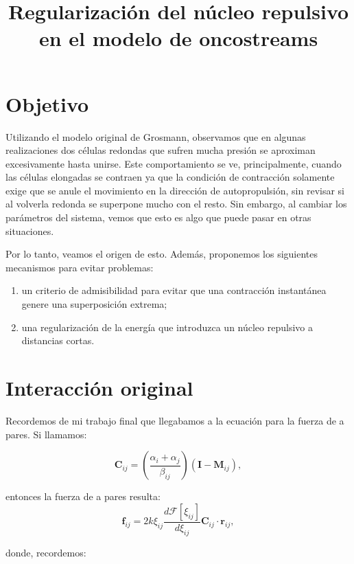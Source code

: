 \documentclass[11pt,a4paper]{article}
\title{Regularización del núcleo repulsivo en el modelo de oncostreams}
\author{}
\date{}
\begin{document}
\maketitle

\section{Objetivo}

Utilizando el modelo original de Grosmann, observamos que en algunas realizaciones dos células redondas que sufren mucha presión se aproximan excesivamente hasta unirse. Este comportamiento se ve, principalmente, cuando las células elongadas se contraen ya que la condición de contracción solamente exige que se anule el movimiento en la dirección de autopropulsión, sin revisar si al volverla redonda se superpone mucho con el resto. Sin embargo, al cambiar los parámetros del sistema, vemos que esto es algo que puede pasar en otras situaciones.


Por lo tanto, veamos el origen de esto. Además, proponemos los siguientes mecanismos para evitar problemas:

\begin{enumerate}
    \item un criterio de admisibilidad para evitar que una contracción instantánea genere una superposición extrema;
    \item una regularización de la energía que introduzca un núcleo repulsivo a distancias cortas.
\end{enumerate}

\section{Interacción original}

Recordemos de mi trabajo final que llegabamos a la ecuación para la fuerza de a pares. Si llamamos:

\begin{equation}
	\mathbf C_{ij}= \left(\frac{\alpha_i + \alpha_j}{\beta_{ij}}\right)(\mathbf{I}-\mathbf{M}_{ij}),
	\label{C_ij}
\end{equation}

entonces la fuerza de a pares resulta:
\begin{equation}
	\mathbf{f}_{ij}
	=
	2 k \xi_{ij} \frac{d\mathcal{F}[\xi_{ij}]}{d\xi_{ij}}\mathbf C_{ij}  \cdot \mathbf{r}_{ij},
	\label{eq:force_general}
\end{equation}

donde, recordemos: 
\end{document}
